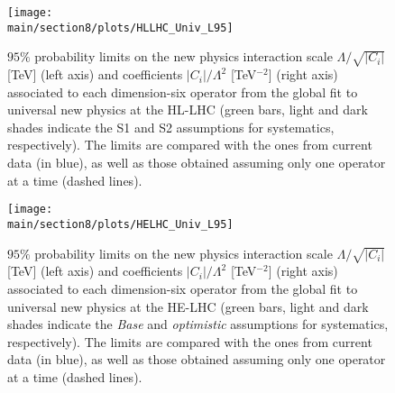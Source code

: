 \begin{figure}[h]
\centering
  \hspace{-0.1cm}\texttt{[image: \\main/section8/plots/HLLHC\_Univ\_L95]}
  \vspace{-0.2cm}
  \caption{$95\%$ probability limits on the new physics interaction scale $\Lambda/\sqrt{\vert C_i\vert}$ [TeV] (left axis) and coefficients $\vert C_i\vert /\Lambda^2$ [TeV$^{-2}$] (right axis) associated to each dimension-six operator from the global fit to universal new physics at the HL-LHC (green bars, light and dark shades indicate the S1 and S2 assumptions for systematics, respectively). The limits are compared with the ones from current data (in blue), as well as those obtained assuming only one operator at a time (dashed lines).~\label{fig:dim6U_HLLHC}}
\end{figure}

\begin{figure}[h]
\centering
  \hspace{-0.1cm}\texttt{[image: \\main/section8/plots/HELHC\_Univ\_L95]}
  \vspace{-0.2cm}
   \caption{$95\%$ probability limits on the new physics interaction scale $\Lambda/\sqrt{\vert C_i\vert }$ [TeV] (left axis) and coefficients $\vert C_i\vert/\Lambda^2$ [TeV$^{-2}$] (right axis) associated to each dimension-six operator from the global fit to universal new physics at the HE-LHC (green bars, light and dark shades indicate the {\it Base} and {\it optimistic} assumptions for systematics, respectively). The limits are compared with the ones from current data (in blue), as well as those obtained assuming only one operator at a time (dashed lines).~\label{fig:dim6U_HELHC}}
\end{figure}

